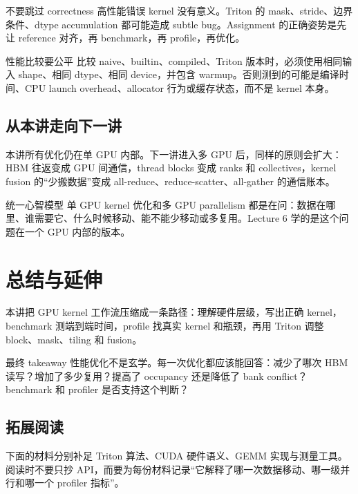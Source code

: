 \documentclass[a4paper]{article}
\begin{document}
\begin{importantbox}{不要跳过 correctness}
高性能错误 kernel 没有意义。Triton 的 mask、stride、边界条件、dtype accumulation 都可能造成 subtle bug。Assignment 的正确姿势是先让 reference 对齐，再 benchmark，再 profile，再优化。
\end{importantbox}

\begin{warningbox}{性能比较要公平}
比较 naive、builtin、compiled、Triton 版本时，必须使用相同输入 shape、相同 dtype、相同 device，并包含 warmup。否则测到的可能是编译时间、CPU launch overhead、allocator 行为或缓存状态，而不是 kernel 本身。
\end{warningbox}

\subsection{从本讲走向下一讲}

本讲所有优化仍在单 GPU 内部。下一讲进入多 GPU 后，同样的原则会扩大：HBM 往返变成 GPU 间通信，thread blocks 变成 ranks 和 collectives，kernel fusion 的“少搬数据”变成 all-reduce、reduce-scatter、all-gather 的通信账本。

\begin{knowledgebox}{统一心智模型}
单 GPU kernel 优化和多 GPU parallelism 都是在问：数据在哪里、谁需要它、什么时候移动、能不能少移动或多复用。Lecture 6 学的是这个问题在一个 GPU 内部的版本。
\end{knowledgebox}

\section{总结与延伸}
本讲把 GPU kernel 工作流压缩成一条路径：理解硬件层级，写出正确 kernel，benchmark 测端到端时间，profile 找真实 kernel 和瓶颈，再用 Triton 调整 block、mask、tiling 和 fusion。
\begin{importantbox}{最终 takeaway}
性能优化不是玄学。每一次优化都应该能回答：减少了哪次 HBM 读写？增加了多少复用？提高了 occupancy 还是降低了 bank conflict？benchmark 和 profiler 是否支持这个判断？
\end{importantbox}
\subsection{拓展阅读}

下面的材料分别补足 Triton 算法、CUDA 硬件语义、GEMM 实现与测量工具。阅读时不要只抄 API，而要为每份材料记录“它解释了哪一次数据移动、哪一级并行和哪一个 profiler 指标”。
\end{document}
